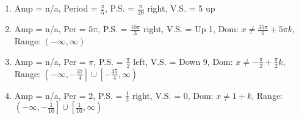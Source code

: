 \begin{enumerate}
	\item Amp = n/a, Period = $\frac{\pi}{5}$, P.S. = $\frac{\pi}{20}$ right, V.S. = 5 up
	\item Amp = n/a, Per = $5\pi$, P.S. = $\frac{10\pi}{3}$ right, V.S. = Up 1, Dom: $x \neq \frac{35\pi}{6} + 5\pi k$, Range: $(-\infty, \infty)$
    \item Amp = n/a, Per = $\pi$, P.S. = $\frac{\pi}{2}$ left, V.S. = Down 9, Dom: $x \neq -\frac{\pi}{2} + \frac{\pi}{2}k$, Range: $\left(-\infty, -\frac{37}{4}\right] \cup \left[-\frac{35}{4}, \infty\right)$
    \item Amp = n/a, Per = 2, P.S. = $\frac{1}{2}$ right, V.S. = 0, Dom: $x \neq 1 + k$, Range: $\left(-\infty, -\frac{1}{10}\right] \cup \left[\frac{1}{10}, \infty\right)$
\end{enumerate}
